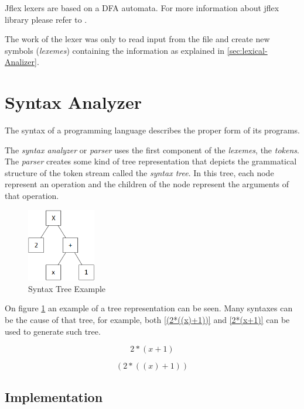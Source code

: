 \documentclass[conference]{IEEEtran}
\theoremstyle{definition}
\begin{document}
Jflex lexers are based on a DFA automata. For more information about jflex library please refer to \cite{JFLEX_MANUAL}.

The work of the lexer was only to read input from the file and create new symbols (\textit{lexemes}) containing the information as explained in \ref{sec:lexical-Analizer}.

\section{Syntax Analyzer} \label{sub_syntax_analyzer}

The syntax of a programming language describes the proper form of its programs.

The \textit{syntax analyzer} or \textit{parser} uses the first component of the \textit{lexemes}, the \textit{tokens}. The \textit{parser} creates some kind of tree representation that depicts the grammatical structure of the token stream called the \textit{syntax tree}. In this tree, each node represent an operation and the children of the node represent the arguments of that operation.

\begin{figure}[H]
	\centering
	\includegraphics[width=3cm]{images/syntax_tree.png}
	\caption{Syntax Tree Example}
	\label{fig_syntax_tree_example}
\end{figure}

On figure \ref{fig_syntax_tree_example} an example of a tree representation can be seen. Many syntaxes can be the cause of that tree, for example, both \ref{(2*((x)+1))} and \ref{2*(x+1)} can be used to generate such tree.

\begin{equation}
2*(x+1)
\label{2*(x+1)}
\end{equation}

\begin{equation}
(2*((x)+1))
\label{(2*((x)+1))}
\end{equation}

\subsection{Implementation}
\end{document}
